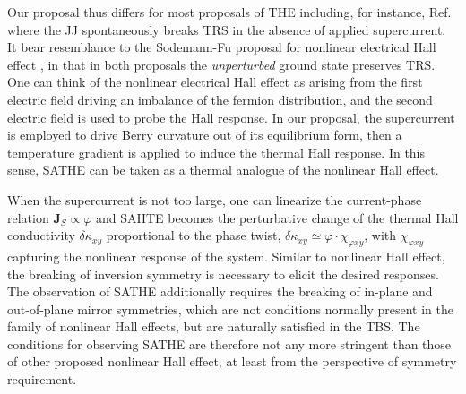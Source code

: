 Our proposal thus differs for most proposals of THE including, for instance, Ref. \cite{can2021high} where the JJ spontaneously breaks TRS in the absence of applied supercurrent. It bear resemblance to the Sodemann-Fu proposal for nonlinear electrical Hall effect \cite{sodemann2015quantum,ma2019observation}, in that in both proposals the \emph{unperturbed} ground state preserves TRS. One can think of the nonlinear electrical Hall effect as arising from the first electric field driving an imbalance of the fermion distribution, and the second electric field is used to probe the Hall response. In our proposal, the supercurrent is employed to drive Berry curvature out of its equilibrium form, then a temperature gradient is applied to induce the thermal Hall response. In this sense, SATHE can be taken as a thermal analogue of the nonlinear Hall effect.

When the supercurrent is not too large, one can linearize the current-phase relation $\bm J_S \propto\varphi$ and SAHTE becomes the perturbative change of the thermal Hall conductivity $\delta \kappa_{xy}$ proportional to the phase twist, $\delta\kappa_{xy}\simeq\varphi\cdot\chi_{\varphi xy}$, with $\chi_{\varphi xy}$ capturing the nonlinear response of the system. Similar to nonlinear Hall effect, the breaking of inversion symmetry is necessary to elicit the desired responses. The observation of SATHE additionally requires the breaking of in-plane and out-of-plane mirror symmetries, which are not conditions normally present in the family of nonlinear Hall effects, but are naturally satisfied in the TBS. The conditions for observing SATHE are therefore not any more stringent than those of other proposed nonlinear Hall effect, at least from the perspective of symmetry requirement. 

